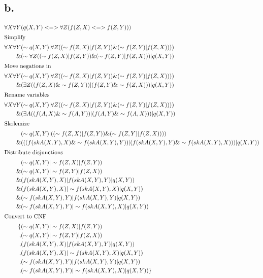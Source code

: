 \documentclass[11pt,a4paper]{article}
\begin{document}
\subsection*{b.}
\begin{equation*}
\begin{split}
\forall X \forall Y &(q(X,Y) <=> \forall Z (f(Z,X) <=> f(Z,Y))) \\
\intertext{Simplify}
\forall X \forall Y &(\sim q(X,Y) | \forall Z ((\sim f(Z,X) | f(Z,Y)) \& (\sim f(Z,Y) | f(Z,X)))) \\
                 \& &(\sim \forall Z ((\sim f(Z,X) | f(Z,Y)) \& (\sim f(Z,Y) | f(Z,X))) | q(X,Y)) \\
\intertext{Move negations in}
\forall X \forall Y &(\sim q(X,Y) | \forall Z ((\sim f(Z,X) | f(Z,Y)) \& (\sim f(Z,Y) | f(Z,X)))) \\
                 \& &(\exists Z ((f(Z,X) \& \sim f(Z,Y)) | (f(Z,Y) \& \sim f(Z,X))) | q(X,Y)) \\
\intertext{Rename variables}
\forall X \forall Y &(\sim q(X,Y) | \forall Z ((\sim f(Z,X) | f(Z,Y)) \& (\sim f(Z,Y) | f(Z,X)))) \\
                 \& &(\exists A ((f(A,X) \& \sim f(A,Y)) | (f(A,Y) \& \sim f(A,X))) | q(X,Y)) \\
\intertext{Skolemize}
                    &(\sim q(X,Y) | ((\sim f(Z,X) | f(Z,Y)) \& (\sim f(Z,Y) | f(Z,X)))) \\
                 \& &(((f(skA(X,Y),X) \& \sim f(skA(X,Y),Y)) | (f(skA(X,Y),Y) \& \sim f(skA(X,Y),X))) | q(X,Y)) \\
\intertext{Distribute disjunctions}
                    &(\sim q(X,Y) | \sim f(Z,X) | f(Z,Y)) \\
                 \& &(\sim q(X,Y) | \sim f(Z,Y) | f(Z,X)) \\
                 \& &(f(skA(X,Y),X) | f(skA(X,Y),Y) | q(X,Y)) \\
                 \& &(f(skA(X,Y),X) | \sim f(skA(X,Y),X) | q(X,Y)) \\
                 \& &(\sim f(skA(X,Y),Y) | f(skA(X,Y),Y) | q(X,Y)) \\
                 \& &(\sim f(skA(X,Y),Y) | \sim f(skA(X,Y),X) | q(X,Y)) \\
\intertext{Convert to CNF}
                 \{ &(\sim q(X,Y) | \sim f(Z,X) | f(Z,Y)) \\
                 ,  &(\sim q(X,Y) | \sim f(Z,Y) | f(Z,X)) \\
                 ,  &(f(skA(X,Y),X) | f(skA(X,Y),Y) | q(X,Y)) \\
                 ,  &(f(skA(X,Y),X) | \sim f(skA(X,Y),X) | q(X,Y)) \\
                 ,  &(\sim f(skA(X,Y),Y) | f(skA(X,Y),Y) | q(X,Y)) \\
                 ,  &(\sim f(skA(X,Y),Y) | \sim f(skA(X,Y),X) | q(X,Y)) \} \\
\end{split}
\end{equation*}
\end{document}
